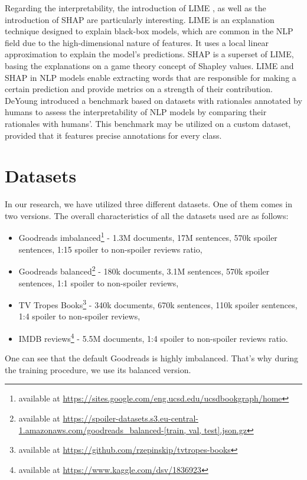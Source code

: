 \documentclass[11pt]{article}
\begin{document}
Regarding the interpretability, the introduction of LIME \cite{lime}, as well as the introduction of SHAP \cite{NIPS2017_7062} are particularly interesting. LIME is an explanation technique designed to explain black-box models, which are common in the NLP field due to the high-dimensional nature of features. It uses a local linear approximation to explain the model's predictions. SHAP is a superset of LIME, basing the explanations on a game theory concept of Shapley values. LIME and SHAP in NLP models enable extracting words that are responsible for making a certain prediction and provide metrics on a strength of their contribution. DeYoung  introduced a benchmark based on datasets with rationales annotated by humans to assess the interpretability of NLP models by comparing their rationales with humans'. This benchmark may be utilized on a custom dataset, provided that it features precise annotations for every class.


\section{Datasets} \label{datasets}
In our research, we have utilized three different datasets. One of them comes in two versions. The overall characteristics of all the datasets used are as follows:
\begin{itemize}
\item Goodreads imbalanced\footnote{available at \url{https://sites.google.com/eng.ucsd.edu/ucsdbookgraph/home}} - 1.3M documents, 17M sentences, 570k spoiler sentences, 1:15 spoiler to non-spoiler reviews ratio,
\item Goodreads balanced\footnote{available at \url{https://spoiler-datasets.s3.eu-central-1.amazonaws.com/goodreads_balanced-[train, val, test].json.gz}} - 180k documents, 3.1M sentences, 570k spoiler sentences, 1:1 spoiler to non-spoiler reviews,
\item TV Tropes Books\footnote{available at \url{https://github.com/rzepinskip/tvtropes-books}} - 340k documents, 670k sentences, 110k spoiler sentences, 1:4 spoiler to non-spoiler reviews,
\item IMDB reviews\footnote{available at \url{https://www.kaggle.com/dsv/1836923}} - 5.5M documents, 1:4 spoiler to non-spoiler reviews ratio.
\end{itemize}
One can see that the default Goodreads is highly imbalanced. That's why during the training procedure, we use its balanced version.
\end{document}
